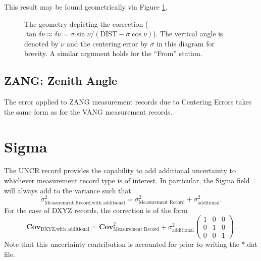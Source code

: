 This result may be found geometrically via Figure \ref{Fig:VANG_Cent}.
\begin{figure}[!htbp]
\centering
{}
\caption{The geometry depicting the correction ($\tan\delta\nu\approx\delta\nu=\sigma\sin\nu/(\text{DIST}-\sigma\cos\nu)$).  The vertical angle is denoted by $\nu$ and the centering error by $\sigma$ in this diagram for brevity.  A similar argument holds for the ``From'' station.}
\label{Fig:VANG_Cent}
\end{figure}

\subsection{ZANG: Zenith Angle}
The error applied to ZANG measurement records due to Centering Errors takes the same form as for the VANG measurement records.
\section{Sigma}
The UNCR record provides the capability to add additional uncertainty to whichever measurement record type is of interest.  In particular, the Sigma field will always add to the variance such that
\begin{equation}
\sigma^2_{\text{Measurement Record,with additional}}=\sigma^2_{\text{Measurement Record}}+\sigma^2_{\text{additional}}.
\end{equation}
For the case of DXYZ records, the correction is of the form
\begin{equation}
\textbf{Cov}_{\text{DXYZ,with additional}}=\textbf{Cov}^2_{\text{Measurement Record}}+\sigma^2_{\text{additional}}\left(\begin{array}{ccc}1&0&0\\0&1&0\\0&0&1\end{array}\right).
\end{equation}
Note that this uncertainty contribution is accounted for prior to writing the *.dat file.

